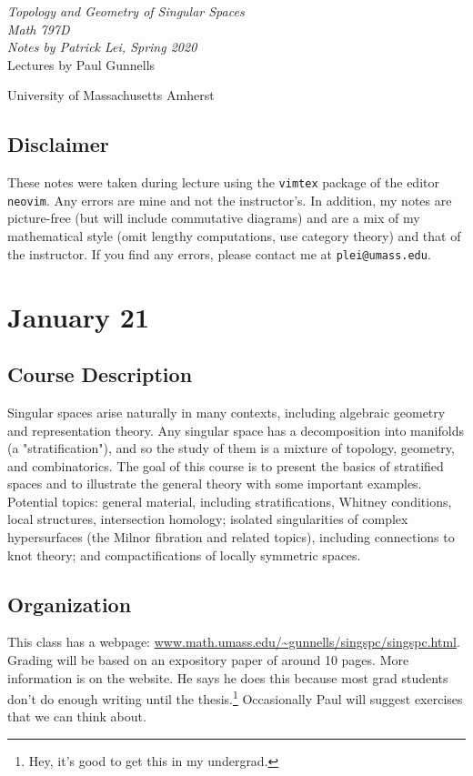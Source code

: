 \documentclass[leqno, openany]{memoir}
\theoremstyle{definition}
\theoremstyle{remark}
\theoremstyle{plain}
\theoremstyle{definition}
\theoremstyle{remark}
\newcommand*{\titleSW}
    {\begingroup%
    \raggedleft
    \vspace*{\baselineskip}
    {\Huge\itshape Topology and Geometry of Singular Spaces \\ Math 797D}\\[\baselineskip]
    {\large\itshape Notes by Patrick Lei,
                    Spring 2020}\\[0.2\textheight]
    {\Large Lectures by Paul Gunnells}\par
    \vfill
    {\Large \sffamily University of Massachusetts Amherst}
    \vspace*{\baselineskip}
\endgroup}
\begin{document}
    
\begin{titlingpage}
\titleSW
\end{titlingpage}

\thispagestyle{empty}
\section*{Disclaimer}%
\label{sec:disclaimer}

These notes were taken during lecture using the \texttt{vimtex} package of the editor \texttt{neovim}. 
Any errors are mine and not the instructor's. 
In addition, my notes are picture-free (but will include commutative diagrams) and are a mix of my mathematical style 
(omit lengthy computations, use category theory) and that of the instructor.
If you find any errors, please contact me at \texttt{plei@umass.edu}.
\newpage



\tableofcontents

\chapter{January 21}%
\label{cha:january_21}

\section{Course Description}%
\label{sec:course_description}

Singular spaces arise naturally in many contexts, including algebraic geometry and representation theory. Any singular space has a decomposition into manifolds (a "stratification"), and so the study of them is a mixture of topology, geometry, and combinatorics. The goal of this course is to present the basics of stratified spaces and to illustrate the general theory with some important examples. Potential topics: general material, including stratifications, Whitney conditions, local structures, intersection homology; isolated singularities of complex hypersurfaces (the Milnor fibration and related topics), including connections to knot theory; and compactifications of locally symmetric spaces.

\section{Organization}%
\label{sec:organization}

This class has a webpage: \url{www.math.umass.edu/~gunnells/singspc/singspc.html}. Grading will be based on an expository paper of around 10 pages. More information is on the website. He says he does this because most grad students don't do enough writing until the thesis.\footnote{Hey, it's good to get this in my undergrad.} Occasionally Paul will suggest exercises that we can think about.
\end{document}
